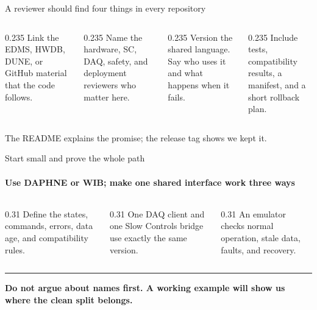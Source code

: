 \documentclass[aspectratio=169,11pt]{beamer}
\begin{document}
\begin{frame}{A reviewer should find four things in every repository}
  \begin{columns}[T,onlytextwidth]
    \begin{column}{0.235\textwidth}
        {Link the EDMS, HWDB, DUNE, or GitHub material that the code follows.}
    \end{column}
    \begin{column}{0.235\textwidth}
        {Name the hardware, SC, DAQ, safety, and deployment reviewers who matter here.}
    \end{column}
    \begin{column}{0.235\textwidth}
        {Version the shared language. Say who uses it and what happens when it fails.}
    \end{column}
    \begin{column}{0.235\textwidth}
        {Include tests, compatibility results, a manifest, and a short rollback plan.}
    \end{column}
  \end{columns}

  \medskip
  {\centering\color{DuneTextMuted}\large
    The README explains the promise; the release tag shows we kept it.\par}
\end{frame}

\begin{frame}{Start small and prove the whole path}
  \framesubtitle{Use DAPHNE or WIB; make one shared interface work three ways}
  \begin{columns}[T,onlytextwidth]
    \begin{column}{0.31\textwidth}
      \vspace{10mm}
        {Define the states, commands, errors, data age, and compatibility rules.}
    \end{column}
    \begin{column}{0.31\textwidth}
      \vspace{5mm}
        {One DAQ client and one Slow Controls bridge use exactly the same version.}
    \end{column}
    \begin{column}{0.31\textwidth}
        {An emulator checks normal operation, stale data, faults, and recovery.}
    \end{column}
  \end{columns}

  \medskip
  {\color{DuneCoral}\rule{\textwidth}{1.2pt}\par}
  {\footnotesize\bfseries Do not argue about names first. A working example will show us where the clean split belongs.}
\end{frame}
\end{document}
